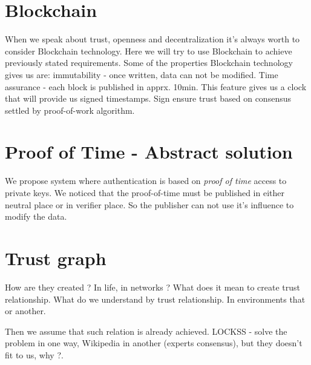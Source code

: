 \documentclass[nostrict]{szablonPG}
\begin{document}
\section{Blockchain}
When we speak about trust, openness and decentralization it's always worth to consider Blockchain technology. Here we will try to use Blockchain to achieve previously stated requirements. Some of the properties Blockchain technology gives us are: immutability - once written, data can not be modified. Time assurance - each block is published in apprx. 10min. This feature gives us a clock that will provide us signed timestamps. Sign ensure trust based on consensus settled by proof-of-work algorithm.

\section{Proof of Time - Abstract solution}
We propose system where authentication is based on \textit{proof of time} access to private keys. 
We noticed that the proof-of-time must be published in either neutral place or in verifier place. So the publisher can not use it's influence to modify the data. 

\section{Trust graph}
How are they created ? In life, in networks ? What does it mean to create trust relationship. What do we understand by trust relationship. In environments that or another. 

Then we assume that such relation is already achieved. 
LOCKSS - solve the problem in one way, Wikipedia in another (experts consensus), but they doesn't fit to us, why ?. 
\end{document}
